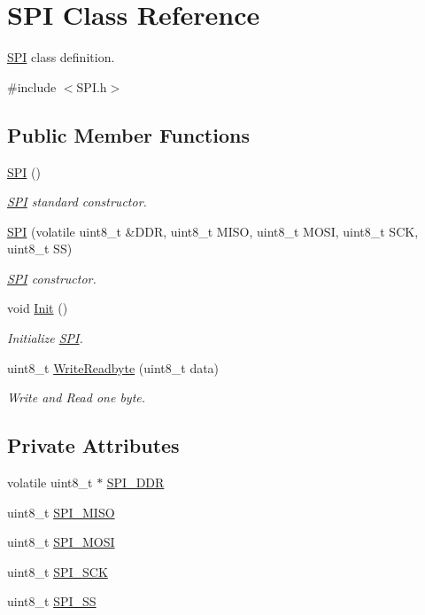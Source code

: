 \hypertarget{classSPI}{}\section{S\+PI Class Reference}
\label{classSPI}


\hyperlink{classSPI}{S\+PI} class definition.  




{\ttfamily \#include $<$S\+P\+I.\+h$>$}

\subsection*{Public Member Functions}
\begin{DoxyCompactItemize}
\item 
\hyperlink{classSPI_a2ba081c29fbdecc704c6bf00b24d5205}{S\+PI} ()
\begin{DoxyCompactList}\small\item\em \hyperlink{classSPI}{S\+PI} standard constructor. \end{DoxyCompactList}\item 
\hyperlink{classSPI_a32722ff55ed030eb70b8a71fa19f2436}{S\+PI} (volatile uint8\+\_\+t \&D\+DR, uint8\+\_\+t M\+I\+SO, uint8\+\_\+t M\+O\+SI, uint8\+\_\+t S\+CK, uint8\+\_\+t SS)
\begin{DoxyCompactList}\small\item\em \hyperlink{classSPI}{S\+PI} constructor. \end{DoxyCompactList}\item 
void \hyperlink{classSPI_a7e28e3328e32b650ead0f7640cee6e81}{Init} ()
\begin{DoxyCompactList}\small\item\em Initialize \hyperlink{classSPI}{S\+PI}. \end{DoxyCompactList}\item 
uint8\+\_\+t \hyperlink{classSPI_ad2c97b15ee0417c355a899c28d2efa5d}{Write\+Readbyte} (uint8\+\_\+t data)
\begin{DoxyCompactList}\small\item\em Write and Read one byte. \end{DoxyCompactList}\end{DoxyCompactItemize}
\subsection*{Private Attributes}
\begin{DoxyCompactItemize}
\item 
volatile uint8\+\_\+t $\ast$ \hyperlink{classSPI_a5dca744360bf2b10d74ab512f2fb71ea}{S\+P\+I\+\_\+\+D\+DR}
\item 
uint8\+\_\+t \hyperlink{classSPI_a6fefdb147a2789fe10efb13f8100235c}{S\+P\+I\+\_\+\+M\+I\+SO}
\item 
uint8\+\_\+t \hyperlink{classSPI_a10159404dbabef20333fe73f69a3fca6}{S\+P\+I\+\_\+\+M\+O\+SI}
\item 
uint8\+\_\+t \hyperlink{classSPI_ad9ff914a9831b004b1f8fa5368558e01}{S\+P\+I\+\_\+\+S\+CK}
\item 
uint8\+\_\+t \hyperlink{classSPI_ad4cb7d5cd46647baf68bb98a0e06e2aa}{S\+P\+I\+\_\+\+SS}
\end{DoxyCompactItemize}


